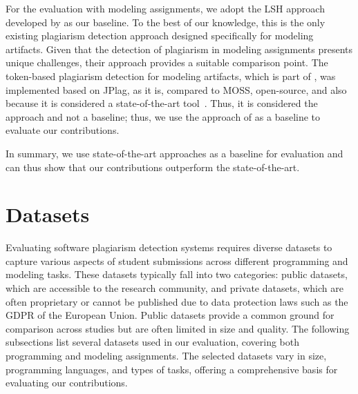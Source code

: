 For the evaluation with modeling assignments, we adopt the \ac{LSH} approach developed by \citet{Martinez2020} as our baseline. To the best of our knowledge, this is the only existing plagiarism detection approach designed specifically for modeling artifacts. Given that the detection of plagiarism in modeling assignments presents unique challenges, their approach provides a suitable comparison point.
%
The token-based plagiarism detection for modeling artifacts, which is part of , was implemented based on JPlag, as it is, compared to MOSS, open-source, and also because it is considered a state-of-the-art tool~\cite{Novak2019, weber2012, Aniceto2021}. Thus, it is considered the approach and not a baseline; thus, we use the approach of \citet{Martinez2020} as a baseline to evaluate our contributions.

In summary, we use state-of-the-art approaches as a baseline for evaluation and can thus show that our contributions outperform the state-of-the-art.


\section{Datasets}\label{sec:datasets}
Evaluating software plagiarism detection systems requires diverse datasets to capture various aspects of student submissions across different programming and modeling tasks. These datasets typically fall into two categories: public datasets, which are accessible to the research community, and private datasets, which are often proprietary or cannot be published due to data protection laws such as the \ac{GDPR} of the European Union. Public datasets provide a common ground for comparison across studies but are often limited in size and quality. 
%
The following subsections list several datasets used in our evaluation, covering both programming and modeling assignments. The selected datasets vary in size, programming languages, and types of tasks, offering a comprehensive basis for evaluating our contributions. 

